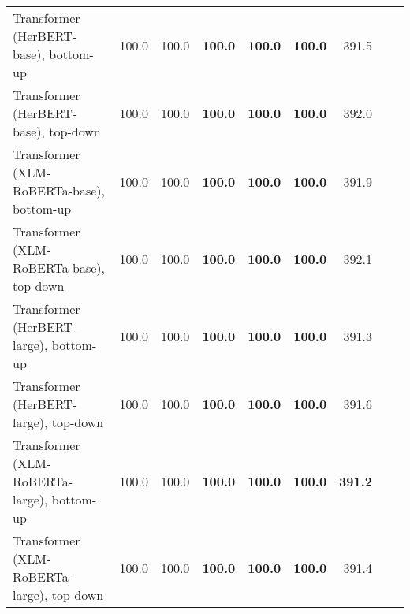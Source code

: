 \begin{table}[ht!]
{\begin{tabular}{lrrrrrrrr}
  Transformer (HerBERT-base), bottom-up & 100.0 & 100.0 & \textbf{100.0} & \textbf{100.0} & \textbf{100.0} & 391.5 \\ 
  Transformer (HerBERT-base), top-down & 100.0 & 100.0 & \textbf{100.0} & \textbf{100.0} & \textbf{100.0} & 392.0 \\ 
  Transformer (XLM-RoBERTa-base), bottom-up & 100.0 & 100.0 & \textbf{100.0} & \textbf{100.0} & \textbf{100.0} & 391.9 \\ 
  Transformer (XLM-RoBERTa-base), top-down & 100.0 & 100.0 & \textbf{100.0} & \textbf{100.0} & \textbf{100.0} & 392.1 \\ 
  Transformer (HerBERT-large), bottom-up & 100.0 & 100.0 & \textbf{100.0} & \textbf{100.0} & \textbf{100.0} & 391.3 \\ 
  Transformer (HerBERT-large), top-down & 100.0 & 100.0 & \textbf{100.0} & \textbf{100.0} & \textbf{100.0} & 391.6 \\ 
  Transformer (XLM-RoBERTa-large), bottom-up & 100.0 & 100.0 & \textbf{100.0} & \textbf{100.0} & \textbf{100.0} & \textbf{391.2} \\ 
  Transformer (XLM-RoBERTa-large), top-down & 100.0 & 100.0 & \textbf{100.0} & \textbf{100.0} & \textbf{100.0} & 391.4 \\ 
   \hline
\end{tabular}
}
\end{table}




